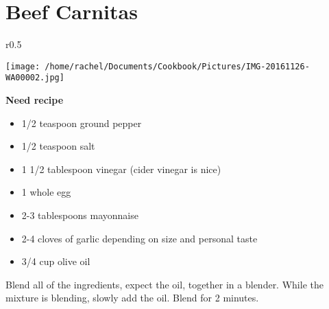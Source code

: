 \documentclass{article}
\begin{document}
\restoregeometry



\section*{\fontsize{25}{15}\selectfont Beef Carnitas}



\begin{wrapfigure}{r}{0.5\textwidth}
\
  \begin{center}
 	\hfill\begin{minipage}{\textwidth}\centering
 	\vspace*{-6cm}
		\texttt{[image: /home/rachel/Documents/Cookbook/Pictures/IMG-20161126-WA00002.jpg]}
	\end{minipage}  
	\end{center}

\end{wrapfigure}



\vspace{5mm}

\textbf{Need recipe}
 
\vspace{5mm}
{\selectfont 
    \begin{itemize}[noitemsep]
    
      \item[] 1/2 teaspoon ground pepper
      \item[] 1/2 teaspoon salt
      \item[] 1 1/2 tablespoon vinegar (cider vinegar is nice)
      \item[] 1 whole egg
      \item[] 2-3 tablespoons mayonnaise
      \item[] 2-4 cloves of garlic depending on size and personal taste
      \item[] 3/4 cup olive oil
      
    \end{itemize}
    }
\vspace{5mm}
    
Blend all of the ingredients, expect the oil, together in a blender. While the mixture is blending, slowly add the oil. Blend for 2 minutes.
\end{document}
